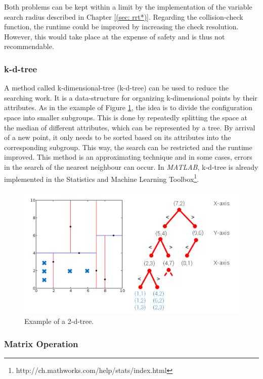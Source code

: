 Both problems can be kept within a limit by the implementation of the variable search radius described in Chapter \ref{(sec: rrt*)}. Regarding the collision-check function, the runtime could be improved by increasing the check resolution. However, this would take place at the expense of safety and is thus not recommendable.\\  

\subsubsection{k-d-tree}

A method called k-dimensional-tree (k-d-tree) can be used to reduce the searching work. It is a data-structure for organizing k-dimensional points by their attributes. As in the example of Figure \ref{pics:kd_tree}, the idea is to divide the configuration space into smaller subgroups. This is done by repeatedly splitting the space at the median of different attributes, which can be represented by a tree. By arrival of a new point, it only needs to be sorted based on its attributes into the corresponding subgroup. This way, the search can be restricted and the runtime improved. This method is an approximating technique and in some cases, errors in the search of the nearest neighbour can occur. In \textit{MATLAB}, k-d-tree is already implemented in the Statistics and Machine Learning Toolbox\footnote{http://ch.mathworks.com/help/stats/index.html}.

 
\begin{figure} [h]
	\centering
	\includegraphics[width=1\textwidth]{images/kd-tree.png}
	\caption{Example of a 2-d-tree.}
	\label{pics:kd_tree}
\end{figure}

\subsubsection{Matrix Operation}

